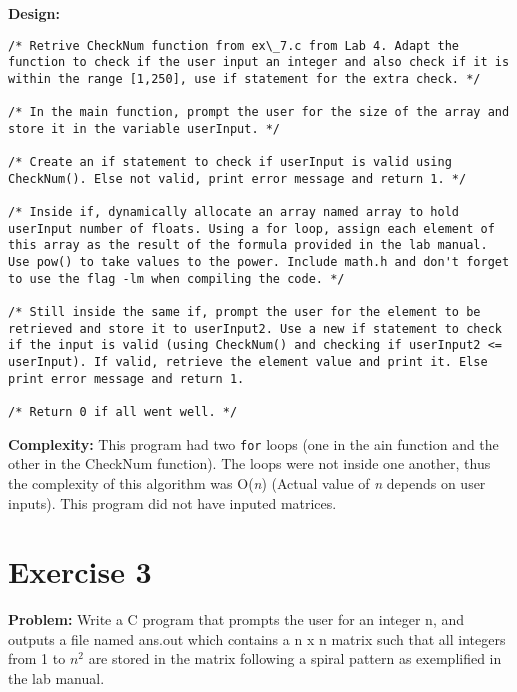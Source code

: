 \documentclass{article}
\begin{document}
\textbf{Design:}
\begin{lstlisting}[numbers=none]
/* Retrive CheckNum function from ex\_7.c from Lab 4. Adapt the function to check if the user input an integer and also check if it is within the range [1,250], use if statement for the extra check. */

/* In the main function, prompt the user for the size of the array and store it in the variable userInput. */

/* Create an if statement to check if userInput is valid using CheckNum(). Else not valid, print error message and return 1. */

/* Inside if, dynamically allocate an array named array to hold userInput number of floats. Using a for loop, assign each element of this array as the result of the formula provided in the lab manual. Use pow() to take values to the power. Include math.h and don't forget to use the flag -lm when compiling the code. */

/* Still inside the same if, prompt the user for the element to be retrieved and store it to userInput2. Use a new if statement to check if the input is valid (using CheckNum() and checking if userInput2 <= userInput). If valid, retrieve the element value and print it. Else print error message and return 1.

/* Return 0 if all went well. */
\end{lstlisting}
\hfill \break
\textbf{Complexity:} This program had two \texttt{for} loops (one in the ain function and the other in the CheckNum function). The loops were not inside one another, thus the complexity of this algorithm was O(\textit{n}) (Actual value of \textit{n} depends on user inputs). This program did not have inputed matrices.


\newpage

\section{Exercise 3}

\textbf{Problem:} Write a C program that prompts the user for an integer n, and outputs a file named ans.out which contains a n x n matrix such that all integers from 1 to $n^2$ are stored in the matrix following a spiral pattern as exemplified in the lab manual. \\
\end{document}
